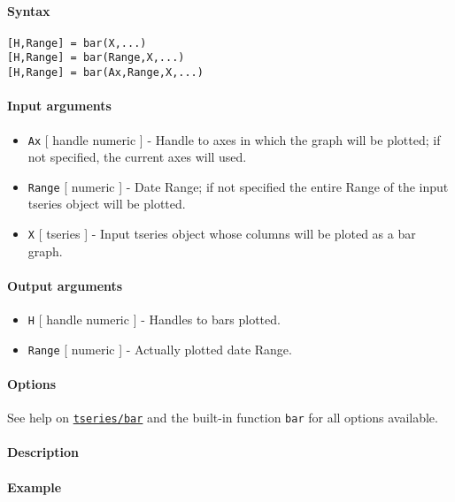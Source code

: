 


	\paragraph{Syntax}

\begin{verbatim}
[H,Range] = bar(X,...)
[H,Range] = bar(Range,X,...)
[H,Range] = bar(Ax,Range,X,...)
\end{verbatim}

\paragraph{Input arguments}

\begin{itemize}
\item
  \texttt{Ax} {[} handle \textbar{} numeric {]} - Handle to axes in
  which the graph will be plotted; if not specified, the current axes
  will used.
\item
  \texttt{Range} {[} numeric {]} - Date Range; if not specified the
  entire Range of the input tseries object will be plotted.
\item
  \texttt{X} {[} tseries {]} - Input tseries object whose columns will
  be ploted as a bar graph.
\end{itemize}

\paragraph{Output arguments}

\begin{itemize}
\item
  \texttt{H} {[} handle \textbar{} numeric {]} - Handles to bars
  plotted.
\item
  \texttt{Range} {[} numeric {]} - Actually plotted date Range.
\end{itemize}

\paragraph{Options}

See help on \href{tseries/bar}{\texttt{tseries/bar}} and the built-in
function \texttt{bar} for all options available.

\paragraph{Description}

\paragraph{Example}


